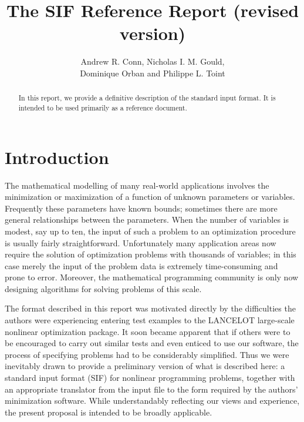 \documentclass[a4paper]{article}
\title{The SIF Reference Report (revised version)}
\author{Andrew R. Conn, Nicholas I. M. Gould, \\ Dominique Orban
and Philippe L. Toint}
\begin{document}


\maketitle

\begin{abstract}
In this report, we provide a definitive description of the standard
input format.
It is intended to be used primarily as a reference document.
\end{abstract}


\section{\label{S1.1}Introduction}
\setcounter{figure}{0}

The mathematical   modelling of many real-world  applications involves
the  minimization or maximization of  a function of unknown parameters
or   variables.   Frequently   these  parameters   have known  bounds;
sometimes there are more general relationships between the parameters.
When the number of variables is  modest,  say up  to ten, the input of
such  a   problem to  an  optimization procedure  is    usually fairly
straightforward. Unfortunately many application areas  now require the
solution of optimization problems with thousands of variables; in this
case merely the input of the problem data  is extremely time-consuming
and prone to error. Moreover,  the mathematical programming  community
is only now designing algorithms for solving problems of this scale.

The format described in this report
was motivated directly by the  difficulties the authors were
experiencing entering test examples to the {\sf  LANCELOT} large-scale
nonlinear optimization  package.  It soon    became apparent  that  if
others  were to  be  encouraged to carry  out similar  tests  and even
enticed to use our software, the process of specifying problems had to
be considerably simplified. Thus we were inevitably drawn to provide a
preliminary   version of what   is described here:
a standard input format  (SIF) for nonlinear programming
problems, together with an appropriate translator from the  input file
to  the form required  by the  authors'  minimization software.  While
understandably reflecting   our views  and   experience, the   present
proposal is intended to be broadly applicable.
\end{document}
